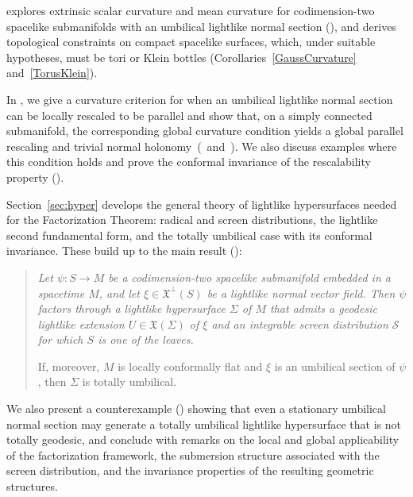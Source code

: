\documentclass[11pt]{article}
\numberwithin{equation}{section}
\begin{document}
 explores extrinsic scalar curvature and mean curvature for codimension-two spacelike submanifolds with an umbilical lightlike normal section (), and derives topological constraints on compact spacelike surfaces, which, under suitable hypotheses, must be tori or Klein bottles (Corollaries~\ref{GaussCurvature} and~\ref{TorusKlein}).

In , we give a curvature criterion for when an umbilical lightlike normal section can be locally rescaled to be parallel and show that, on a simply connected submanifold, the corresponding global curvature condition yields a global parallel rescaling and trivial normal holonomy~(~and~). We also discuss examples where this condition holds and prove the conformal invariance of the rescalability property ().

Section~\ref{sec:hyper} develops the general theory of lightlike hypersurfaces needed for the Factorization Theorem: radical and screen distributions, the lightlike second fundamental form, and the totally umbilical case with its conformal invariance. These build up to the main result ():
\begin{quote}\itshape
	Let $\psi\colon S\to M$ be a codimension-two spacelike submanifold
embedded in a spacetime $M$, and let
$\xi\in\mathfrak X^\perp(S)$ be a lightlike normal vector field.
Then $\psi$ factors through a lightlike hypersurface $\Sigma$ of $M$
that admits a geodesic lightlike extension
$U\in\mathfrak X(\Sigma)$ of $\xi$ and an integrable screen
distribution $\mathcal S$ for which $S$ is one of the leaves.

If, moreover, $M$ is locally conformally flat and $\xi$ is an
umbilical section of $\psi$, then $\Sigma$ is totally umbilical.
\end{quote}

We also present a counterexample () showing that even a stationary umbilical normal section may generate a totally umbilical lightlike hypersurface that is not totally geodesic, and conclude with remarks on the local and global applicability of the factorization framework, the submersion structure associated with the screen distribution, and the invariance properties of the resulting geometric structures.
\end{document}
